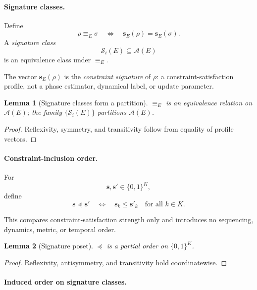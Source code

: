\documentclass[aps,prx,onecolumn,11pt]{revtex4-2}
\theoremstyle{plain}
\newtheorem{lemma}{Lemma}
\theoremstyle{definition}
\theoremstyle{remark}
\begin{document}
\paragraph{Signature classes.}

Define
\[
\rho\equiv_E\sigma
\quad\Longleftrightarrow\quad
\mathbf{s}_E(\rho)=\mathbf{s}_E(\sigma).
\]
A \emph{signature class}
\[
\mathcal{S}_i(E)\subseteq\mathcal{A}(E)
\]
is an equivalence class under \(\equiv_E\).

The vector \(\mathbf{s}_E(\rho)\) is the \emph{constraint signature} of
\(\rho\): a constraint-satisfaction profile, not a phase estimator,
dynamical label, or update parameter.

\begin{lemma}[Signature classes form a partition]
\label{lem:signature_partition}
\(\equiv_E\) is an equivalence relation on \(\mathcal{A}(E)\); the
family \(\{\mathcal{S}_i(E)\}\) partitions \(\mathcal{A}(E)\).
\end{lemma}

\begin{proof}
Reflexivity, symmetry, and transitivity follow from equality of profile
vectors.
\end{proof}

\paragraph{Constraint-inclusion order.}

For
\[
\mathbf{s},\mathbf{s}'\in\{0,1\}^K,
\]
define
\[
\mathbf{s}\preceq\mathbf{s}'
\quad\Longleftrightarrow\quad
\mathbf{s}_k\leq\mathbf{s}'_k
\quad
\text{for all }k\in K.
\]

This compares constraint-satisfaction strength only and introduces no
sequencing, dynamics, metric, or temporal order.

\begin{lemma}[Signature poset]
\label{lem:signature_poset}
\(\preceq\) is a partial order on \(\{0,1\}^K\).
\end{lemma}

\begin{proof}
Reflexivity, antisymmetry, and transitivity hold coordinatewise.
\end{proof}

\paragraph{Induced order on signature classes.}
\end{document}
